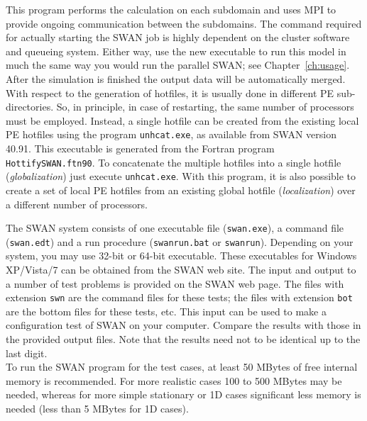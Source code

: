 \documentclass[12pt]{book}
\begin{document}
This program performs the calculation on each subdomain and uses MPI to provide ongoing communication between the subdomains.
The command required for actually starting the SWAN job is highly dependent on the cluster software and queueing system. Either way,
use the new executable to run this model in much the same way you would run the parallel SWAN; see Chapter~\ref{ch:usage}.
\\[2ex]
\noindent
After the simulation is finished the output data will be automatically merged. With respect to the generation of hotfiles, it is usually
done in different PE sub-directories. So, in principle, in case of restarting, the same number of processors must be employed. Instead,
a single hotfile can be created from the existing local PE hotfiles using the program {\tt unhcat.exe}, as available from SWAN version 40.91.
This executable is generated from the Fortran program {\tt HottifySWAN.ftn90}. To concatenate the multiple hotfiles into a single hotfile
({\it globalization}) just execute {\tt unhcat.exe}. With this program, it is also possible to create a set of local PE hotfiles from an
existing global hotfile ({\it localization}) over a different number of processors.

 \label{ch:test}

The SWAN system consists of one executable file ({\tt swan.exe}), a command file ({\tt swan.edt}) and
a run procedure ({\tt swanrun.bat} or {\tt swanrun}).
Depending on your system, you may use 32-bit or 64-bit executable.
These executables for Windows XP/Vista/7 can be obtained from the SWAN web site.
The input and output to a number of test problems
is provided on the SWAN web page. The files with extension {\tt swn} are the command files for these
tests; the files with extension {\tt bot} are the bottom files for these tests, etc. This input can be
used to make a configuration test of SWAN on your computer. Compare the results with those in the
provided output files. Note that the results need not to be identical up to the last digit.
\\[2ex]
\noindent
To run the SWAN program for the test cases, at least 50 MBytes of free internal memory is recommended.
For more realistic cases 100 to 500 MBytes may be needed, whereas for more simple stationary or 1D
cases significant less memory is needed (less than 5 MBytes for 1D cases).
\end{document}

